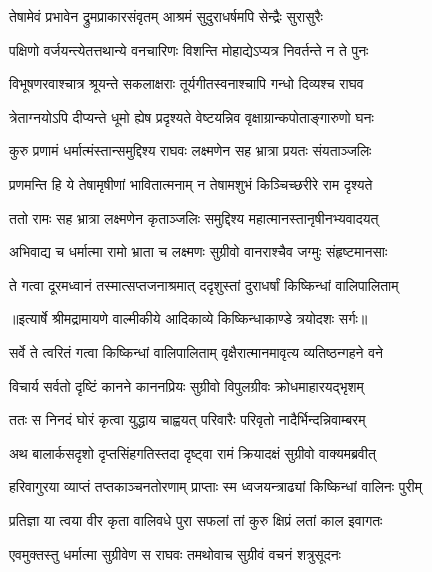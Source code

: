 \twolineshloka
{तेषामेवं प्रभावेन द्रुमप्राकारसंवृतम्}
{आश्रमं सुदुराधर्षमपि सेन्द्रैः सुरासुरैः} %

\twolineshloka
{पक्षिणो वर्जयन्त्येतत्तथान्ये वनचारिणः}
{विशन्ति मोहाद्येऽप्यत्र निवर्तन्ते न ते पुनः} %

\twolineshloka
{विभूषणरवाश्चात्र श्रूयन्ते सकलाक्षराः}
{तूर्यगीतस्वनाश्चापि गन्धो दिव्यश्च राघव} %

\twolineshloka
{त्रेताग्नयोऽपि दीप्यन्ते धूमो ह्येष प्रदृश्यते}
{वेष्टयन्निव वृक्षाग्रान्कपोताङ्गारुणो घनः} %

\twolineshloka
{कुरु प्रणामं धर्मात्मंस्तान्समुद्दिश्य राघवः}
{लक्ष्मणेन सह भ्रात्रा प्रयतः संयताञ्जलिः} %

\twolineshloka
{प्रणमन्ति हि ये तेषामृषीणां भावितात्मनाम्}
{न तेषामशुभं किञ्चिच्छरीरे राम दृश्यते} %

\twolineshloka
{ततो रामः सह भ्रात्रा लक्ष्मणेन कृताञ्जलिः}
{समुद्दिश्य महात्मानस्तानृषीनभ्यवादयत्} %

\twolineshloka
{अभिवाद्य च धर्मात्मा रामो भ्राता च लक्ष्मणः}
{सुग्रीवो वानराश्चैव जग्मुः संहृष्टमानसाः} %

\twolineshloka
{ते गत्वा दूरमध्वानं तस्मात्सप्तजनाश्रमात्}
{ददृशुस्तां दुराधर्षां किष्किन्धां वालिपालिताम्} %


{॥इत्यार्षे श्रीमद्रामायणे वाल्मीकीये आदिकाव्ये किष्किन्धाकाण्डे त्रयोदशः सर्गः॥}


\twolineshloka
{सर्वे ते त्वरितं गत्वा किष्किन्धां वालिपालिताम्}
{वृक्षैरात्मानमावृत्य व्यतिष्ठन्गहने वने} %

\twolineshloka
{विचार्य सर्वतो दृष्टिं कानने काननप्रियः}
{सुग्रीवो विपुलग्रीवः क्रोधमाहारयद्भृशम्} %

\twolineshloka
{ततः स निनदं घोरं कृत्वा युद्धाय चाह्वयत्}
{परिवारैः परिवृतो नादैर्भिन्दन्निवाम्बरम्} %

\twolineshloka
{अथ बालार्कसदृशो दृप्तसिंहगतिस्तदा}
{दृष्ट्वा रामं क्रियादक्षं सुग्रीवो वाक्यमब्रवीत्} %

\twolineshloka
{हरिवागुरया व्याप्तं तप्तकाञ्चनतोरणाम्}
{प्राप्ताः स्म ध्वजयन्त्राढ्यां किष्किन्धां वालिनः पुरीम्} %

\twolineshloka
{प्रतिज्ञा या त्वया वीर कृता वालिवधे पुरा}
{सफलां तां कुरु क्षिप्रं लतां काल इवागतः} %

\twolineshloka
{एवमुक्तस्तु धर्मात्मा सुग्रीवेण स राघवः}
{तमथोवाच सुग्रीवं वचनं शत्रुसूदनः} %

